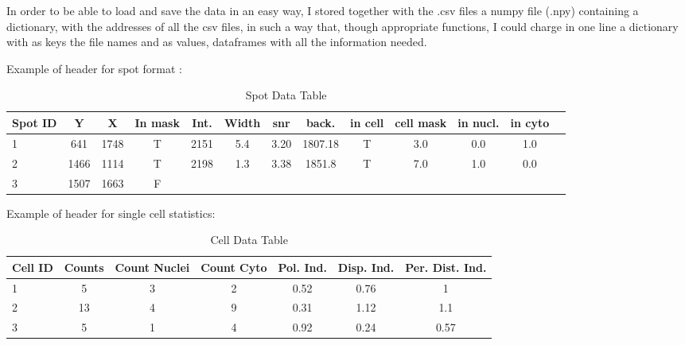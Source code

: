 \documentclass[24pt]{article}
\begin{document}
In order to be able to load and save the data in an easy way, I stored together with the .csv files a numpy file (.npy) containing a dictionary, with the addresses of all the csv files, in such a way that, though appropriate functions, I could charge in one line a dictionary with as keys the file names and as values, dataframes with all the information needed.

Example of header for spot format :


\begin{table}[h!]
    \centering
    \caption{Spot Data Table}
    \label{tab:cell_data}
    \begin{tabular}{|l|c|c|c|c|c|c|c|c|c|c|c|c|}
        \hline
        \textbf{Spot ID} & \textbf{Y} & \textbf{X} & \textbf{In mask} & \textbf{Int.} & \textbf{Width} &  \textbf{snr} &  \textbf{back.} &  \textbf{in cell} &  \textbf{cell mask} &\textbf{in nucl.} & \textbf{in cyto}      \\
        \hline
        1	& 641	&1748	& T	&2151 &	5.4	& 3.20 &	1807.18 &	T 	&3.0 &	0.0	&1.0 \\
        \hline

2		&1466	&1114	&T	&2198 &	1.3 &	3.38 &	1851.8 &T &	7.0 &	1.0 & 	0.0 \\
        \hline
3		&1507	&1663	&F	&  &	  &	 &	&		& 	& 	 & \\
        \hline        
    \end{tabular}
\end{table}






Example of header for single cell statistics:


\begin{table}[h!]
    \centering
    \caption{Cell Data Table}
    \label{tab:cell_data}
    \begin{tabular}{|l|c|c|c|c|c|c|}
        \hline
        \textbf{Cell ID} & \textbf{Counts} & \textbf{Count Nuclei} & \textbf{Count Cyto} & \textbf{Pol. Ind.} & \textbf{Disp. Ind.} & \textbf{Per. Dist. Ind.} \\
        \hline
         1 & 5 & 3 & 2 & 0.52 & 0.76 & 1 \\
         \hline
         2 & 13 & 4 & 9 & 0.31 & 1.12 & 1.1 \\
         \hline
         3 & 5 & 1 & 4 & 0.92 & 0.24 & 0.57 \\
        \hline
    \end{tabular}
\end{table}
\end{document}
